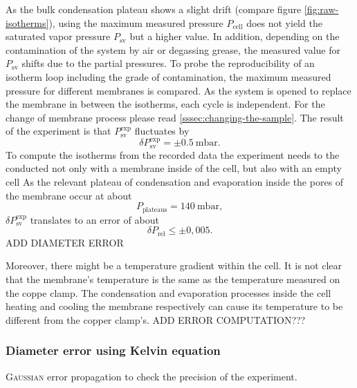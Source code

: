 \documentclass[../thesis.tex]{subfiles}
\begin{document}
        As the bulk condensation plateau shows a slight drift (compare figure \cref{fig:raw-isotherms}), using the maximum measured pressure $P_\mathrm{cell}$ does not yield the saturated vapor pressure $P_\mathrm{sv}$ but a higher value. In addition, depending on the contamination of the system by air or degassing grease, the measured value for $P_\mathrm{sv}$ shifts due to the partial pressures. To probe the reproducibility of an isotherm loop including the grade of contamination, the maximum measured pressure for different membranes is compared. As the system is opened to replace the membrane in between the isotherms, each cycle is independent. For the change of membrane process please read \cref{sssec:changing-the-sample}. The result of the experiment is that $P_\mathrm{sv}^\mathrm{exp}$ fluctuates by
        \begin{equation*}
            \delta P_\mathrm{sv}^\mathrm{exp} = \pm \SI{0,5}{\milli\bar}.
            \label{eq:delta-Psat}
        \end{equation*}
      To compute the isotherms from the recorded data the experiment needs to the conducted not only with a membrane inside of the cell, but also with an empty cell
        As the relevant plateau of condensation and evaporation inside the pores of the membrane occur at about
        \begin{equation*}
            P_\mathrm{plateaus} = \SI{140}{\milli\bar},
        \end{equation*}
        $\delta P_\mathrm{sv}^\mathrm{exp}$ translates to an error of about
        \begin{equation*}
            \delta P_\mathrm{rel} \le \pm 0,005.
            \label{eq:delta-Prel}
        \end{equation*}
        ADD DIAMETER ERROR
        \medskip

        Moreover, there might be a temperature gradient within the cell. It is not clear that the membrane's temperature is the same as the temperature measured on the coppe clamp. The condensation and evaporation processes inside the cell heating and cooling the membrane respectively can cause its temperature to be different from the copper clamp's. ADD ERROR COMPUTATION???


      \subsubsection{Diameter error using Kelvin equation}

        \textsc{Gaussian} error propagation to check the precision of the experiment.
\end{document}
